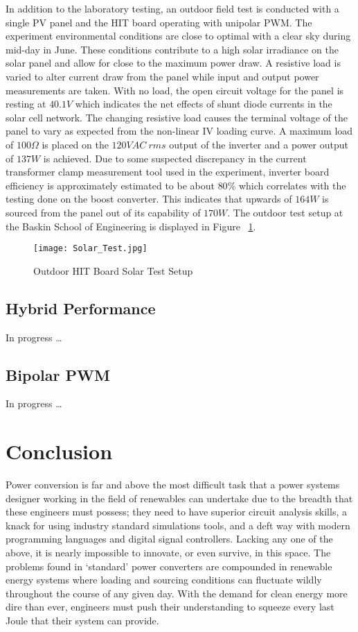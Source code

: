 In addition to the laboratory testing, an outdoor field test is conducted with a single PV panel and the HIT board operating with unipolar PWM. The experiment environmental conditions are close to optimal with a clear sky during mid-day in June. These conditions contribute to a high solar irradiance on the solar panel and allow for close to the maximum power draw. A resistive load is varied to alter current draw from the panel while input and output power measurements are taken. With no load, the open circuit voltage for the panel is resting at $40.1V$ which indicates the net effects of shunt diode currents in the solar cell network. The changing resistive load causes the terminal voltage of the panel to vary as expected from the non-linear IV loading curve. A maximum load of $100\Omega$ is placed on the $120VAC~ rms$ output of the inverter and a power output of $137W$ is achieved. Due to some suspected discrepancy in the current transformer clamp measurement tool used in the experiment, inverter board efficiency is approximately estimated to be about $80\%$ which correlates with the testing done on the boost converter. This indicates that upwards of $164W$ is sourced from the panel out of its capability of $170W$. The outdoor test setup at the Baskin School of Engineering is displayed in Figure ~\ref{Solar Test Setup}.

\begin{figure}
\centering
\texttt{[image: Solar\_Test.jpg]}
\caption{Outdoor HIT Board Solar Test Setup}
\label{Solar Test Setup}
\end{figure}
  

\subsection{Hybrid Performance}
In progress \ldots
\subsection{Bipolar PWM}
In progress \ldots

\section{Conclusion}
Power conversion is far and above the most difficult task that a power systems designer working in the field of renewables can undertake due to the breadth that these engineers must possess; they need to have superior circuit analysis skills, a knack for using industry standard simulations tools, and a deft way with modern programming languages and digital signal controllers. Lacking any one of the above, it is nearly impossible to innovate, or even survive, in this space. The problems found in `standard' power converters are compounded in renewable energy systems where loading and sourcing conditions can fluctuate wildly throughout the course of any given day. With the demand for clean energy more dire than ever, engineers must push their understanding to squeeze every last Joule that their system can provide.

